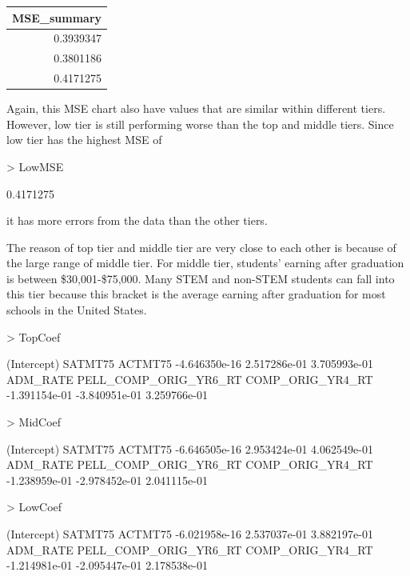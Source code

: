 \documentclass{article}
\begin{document}
\begin{table}[ht]
\centering
\begin{tabular}{r}
  \hline
MSE\_summary \\ 
  \hline
0.3939347 \\ 
  0.3801186 \\ 
  0.4171275 \\ 
   \hline
\end{tabular}
\end{table}Again, this MSE chart also have values that are similar within different tiers. However, low tier is still performing worse than the top and middle tiers. Since low tier has the highest MSE of 
\begin{Schunk}
\begin{Sinput}
> LowMSE
\end{Sinput}
\begin{Soutput}
[1] 0.4171275
\end{Soutput}
\end{Schunk}
it has more errors from the data than the other tiers. 


The reason of top tier and middle tier are very close to each other is because of the large range of middle tier. For middle tier, students' earning after graduation is between \$30,001-\$75,000. Many STEM and non-STEM students can fall into this tier because this bracket is the average earning after graduation for most schools in the United States.  

\begin{Schunk}
\begin{Sinput}
> TopCoef
\end{Sinput}
\begin{Soutput}
          (Intercept)               SATMT75               ACTMT75 
        -4.646350e-16          2.517286e-01          3.705993e-01 
             ADM_RATE PELL_COMP_ORIG_YR6_RT      COMP_ORIG_YR4_RT 
        -1.391154e-01         -3.840951e-01          3.259766e-01 
\end{Soutput}
\begin{Sinput}
> MidCoef
\end{Sinput}
\begin{Soutput}
          (Intercept)               SATMT75               ACTMT75 
        -6.646505e-16          2.953424e-01          4.062549e-01 
             ADM_RATE PELL_COMP_ORIG_YR6_RT      COMP_ORIG_YR4_RT 
        -1.238959e-01         -2.978452e-01          2.041115e-01 
\end{Soutput}
\begin{Sinput}
> LowCoef
\end{Sinput}
\begin{Soutput}
          (Intercept)               SATMT75               ACTMT75 
        -6.021958e-16          2.537037e-01          3.882197e-01 
             ADM_RATE PELL_COMP_ORIG_YR6_RT      COMP_ORIG_YR4_RT 
        -1.214981e-01         -2.095447e-01          2.178538e-01 
\end{Soutput}
\end{Schunk}
\end{document}
